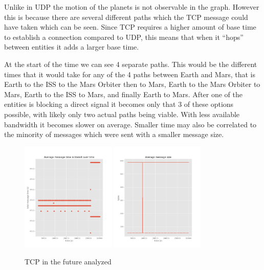\documentclass[a4paper,12pt]{article}
\begin{document}
Unlike in UDP the motion of the planets is not observable in the graph. However
this is because there are several different paths which the TCP message could
have taken which can be seen. Since TCP requires a higher amount of base time to
establish a connection compared to UDP, this means that when it ``hops'' between
entities it adds a larger base time.

At the start of the time we can see 4 separate paths. This would be the
different times that it would take for any of the 4 paths between Earth and
Mars, that is Earth to the ISS to the Mars Orbiter then to Mars, Earth to the
Mars Orbiter to Mars, Earth to the ISS to Mars, and finally Earth to Mars. After
one of the entities is blocking a direct signal it becomes only that 3 of these
options possible, with likely only two actual paths being viable. With less
available bandwidth it becomes slower on average. Smaller time may also be
correlated to the minority of messages which were sent with a smaller message
size.

\begin{figure}[h]
  \centering
  \includegraphics[width=0.4\textwidth]{media/tcp_future.png}
  \includegraphics[width=0.4\textwidth]{media/tcp_future_data.png}
  \caption{TCP in the future analyzed}
\end{figure}
\end{document}
